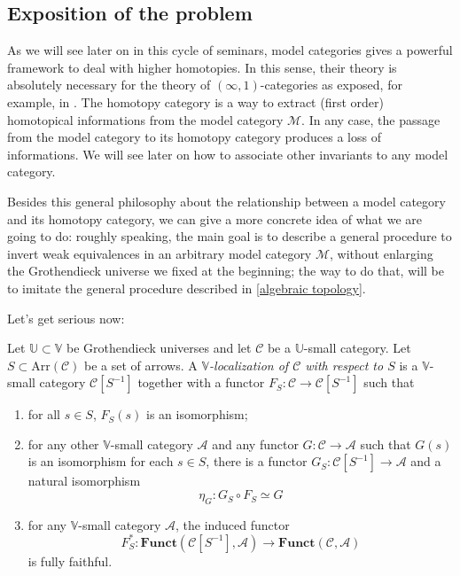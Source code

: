 \subsection{Exposition of the problem}

As we will see later on in this cycle of seminars, model categories gives a powerful framework to deal with higher homotopies. In this sense, their theory is absolutely necessary for the theory of $(\infty,1)$-categories as exposed, for example, in \cite{htt}. The homotopy category is a way to extract (first order) homotopical informations from the model category $\mathcal M$. In any case, the passage from the model category to its homotopy category produces a loss of informations. We will see later on how to associate other invariants to any model category.

Besides this general philosophy about the relationship between a model category and its homotopy category, we can give a more concrete idea of what we are going to do: roughly speaking, the main goal is to describe a general procedure to invert weak equivalences in an arbitrary model category $\mathcal M$, without enlarging the Grothendieck universe we fixed at the beginning; the way to do that, will be to imitate the general procedure described in \ref{algebraic topology}.

Let's get serious now:

\begin{defin} \label{def localization}
Let $\mathbb U \subset \mathbb V$ be Grothendieck universes and let $\mathcal C$ be a $\mathbb U$-small category. Let $S \subset \mathrm{Arr}(\mathcal C)$ be a set of arrows. A \emph{$\mathbb V$-localization of $\mathcal C$ with respect to $S$} is a $\mathbb V$-small category $\mathcal C[S^{-1}]$ together with a functor $F_S \colon \mathcal C \to \mathcal C[S^{-1}]$ such that
\begin{enumerate}
\item for all $s \in S$, $F_S(s)$ is an isomorphism;
\item for any other $\mathbb V$-small category $\mathcal A$ and any functor $G \colon \mathcal C \to \mathcal A$ such that $G(s)$ is an isomorphism for each $s \in S$, there is a functor $G_S \colon \mathcal C[S^{-1}] \to \mathcal A$ and a natural isomorphism
\[
\eta_G \colon G_S \circ F_S \simeq G
\]
\item for any $\mathbb V$-small category $\mathcal A$, the induced functor
\[
F_S^* \colon \mathbf{Funct}(\mathcal C[S^{-1}],\mathcal A) \to \mathbf{Funct}(\mathcal C, \mathcal A)
\]
is fully faithful.
\end{enumerate}
\end{defin}

